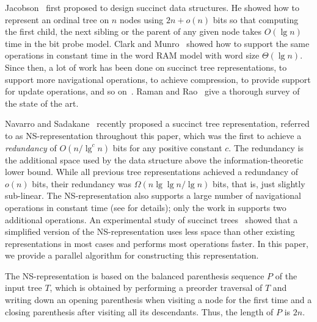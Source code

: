 Jacobson~\cite{j1989} first proposed to design succinct data structures.
He showed how to represent an ordinal tree on $n$ nodes using $2n+o(n)$ bits so
that computing the first child, the next sibling or the parent of any given node
takes $O(\lg n)$ time in the bit probe model.
Clark and Munro~\cite{cm1996} showed how to support the same operations in
constant time in the word RAM model with word size $\Theta(\lg n)$.
Since then, a lot of work has been done on succinct tree representations, to
support more navigational operations, to achieve compression, to provide support
for update operations, and so
on~\cite{mr1997,bdmr1999,grr2004,jss2007,ly2008,hms2012,fm2014,Navarro:2014:FFS:2620785.2601073}.
Raman and Rao~\cite{rr2013} give a thorough survey of the state of the art.

Navarro and Sadakane~\cite{Navarro:2014:FFS:2620785.2601073} recently proposed a
succinct tree representation, referred to as NS-representation throughout this
paper, which was the first to achieve a {\em redundancy} of $O(n/\lg^c n)$ bits
for any positive constant $c$.
The redundancy is the additional space used by the data structure above the
information-theoretic lower bound.
While all previous tree representations achieved a redundancy of $o(n)$ bits,
their redundancy was $\Omega(n \lg\lg n / \lg n)$ bits, that is, just slightly
sub-linear.
The NS-representation also supports a large number of
navigational operations in constant time (see
\cite{Navarro:2014:FFS:2620785.2601073} for details); only
the work in \cite{hms2012,fm2014} supports two additional operations.
An experimental study of succinct trees~\cite{ACNSalenex10} showed that
a simplified version of the NS-representation uses less space
than other existing representations in most cases and performs most operations
faster.
In this paper, we provide a parallel algorithm for constructing this
representation.

The NS-representation is based on the balanced parenthesis sequence $P$ of
the input tree $T$, which is obtained by performing a preorder traversal
of $T$ and writing down an opening parenthesis when visiting
a node for the first time and a closing parenthesis after visiting
all its descendants.
Thus, the length of $P$ is $2n$.

